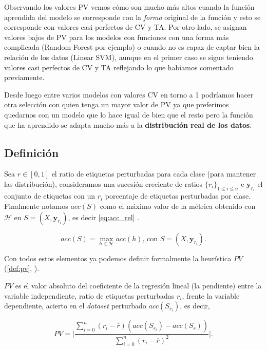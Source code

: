 Observando los valores PV vemos cómo son mucho más altos cuando la función aprendida del modelo se corresponde con la \emph{forma} original de la función y esto se corresponde con valores casi perfectos de CV y TA. Por otro lado, se asignan valores bajos de PV para los modelos con funciones con una forma más complicada (Random Forest por ejemplo) o cuando no es capaz de captar bien la relación de los datos (Linear SVM), aunque en el primer caso se sigue teniendo valores casi perfectos de CV y TA reflejando lo que habíamos comentado previamente.

Desde luego entre varios modelos con valores CV en torno a 1 podríamos hacer otra selección con quien tenga un mayor valor de PV ya que preferimos quedarnos con un modelo que lo hace igual de bien que el resto pero la función que ha aprendido se adapta mucho más a la \textbf{distribución real de los datos}.

\subsection{Definición}

Sea $r \in [0, 1]$ el ratio de etiquetas perturbadas para cada clase (para mantener las distribución), consideramos una sucesión creciente de ratios $\{r_i\}_{1 \leq i \leq n}$ e $\textbf{y}_{r_i}$ el conjunto de etiquetas con un $r_i$ porcentaje de etiquetas perturbadas por clase. Finalmente notamos $acc(S)$ como el máximo valor de la métrica obtenido con $\mathcal{H}$ en $S = (X, \textbf{y}_{r_i})$, es decir \eqref{eq:acc_rel} \cite{zhang2019perturbation}.

\begin{equation}
  acc(S) = \max_{h \in \mathcal{H}} acc(h) \text{, con } S = (X, \textbf{y}_{r_i}).
  \label{eq:acc_rel}
\end{equation}

Con todos estos elementos ya podemos definir formalmente la heurística $PV$ (\autoref{def:pv}, \cite{zhang2019perturbation}).

\begin{definicion}\label{def:pv}
  $PV$ es el valor absoluto del coeficiente de la regresión lineal (la pendiente) entre la variable independiente, ratio de etiquetas perturbadas $r_i$, frente la variable dependiente, acierto en el \emph{dataset} perturbado $acc(S_{r_i})$, es decir,

  $$PV = \Bigg|\dfrac{\sum \limits^n_{i = 0} (r_i - \overline{r})(acc(S_{r_{i}}) - \overline{acc(S_r)})}{\sum \limits^n_{i = 0}(r_i - \overline{r})^2}\Bigg|.$$
\end{definicion}

